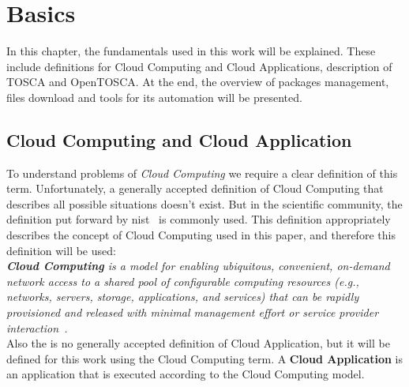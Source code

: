 
\chapter{Basics}
\label{chap:basis}
In this chapter, the fundamentals used in this work will be explained.
These include definitions for Cloud Computing and Cloud Applications, description of TOSCA and OpenTOSCA.
At the end, the overview of packages management, files download and tools for its automation will be presented.
\section{Cloud Computing and Cloud Application} \label{sec:cloud}
To understand problems of \emph{Cloud Computing} we require a clear definition of this term.
Unfortunately, a generally accepted definition of Cloud Computing that describes all possible situations doesn't exist. 
But in the scientific community, the definition put forward by \gls{nist}~\cite*{wwwnist} is commonly used. 
This definition appropriately describes the concept of Cloud Computing used in this paper, and therefore this definition will be used:\\
\emph{\textbf{Cloud Computing}\label{def:nist} is a model for enabling ubiquitous, convenient, on-demand network access to a shared pool of configurable computing resources (e.g., networks, servers, storage, applications, and services) that can be rapidly provisioned and released with minimal management effort or service provider interaction~\cite*{nist}.}\\
Also the is no generally accepted definition of Cloud Application, but it will be defined for this work using the Cloud Computing term.
A \textbf{Cloud Application}\label{def:capp} is an application that is executed according to the Cloud Computing model. %
